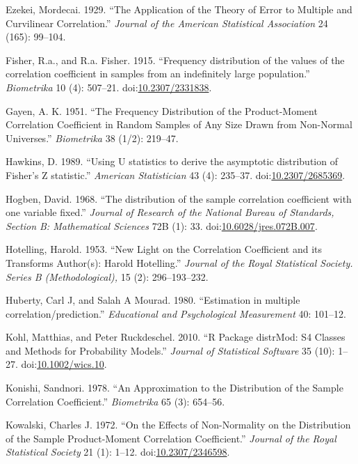 \documentclass[]{article}
\begin{document}
\hypertarget{ref-Ezekei1929}{}
Ezekei, Mordecai. 1929. ``The Application of the Theory of Error to
Multiple and Curvilinear Correlation.'' \emph{Journal of the American
Statistical Association} 24 (165): 99--104.

\hypertarget{ref-Fisher1915}{}
Fisher, R.a., and R.a. Fisher. 1915. ``Frequency distribution of the
values of the correlation coefficient in samples from an indefinitely
large population.'' \emph{Biometrika} 10 (4): 507--21.
doi:\href{https://doi.org/10.2307/2331838}{10.2307/2331838}.

\hypertarget{ref-Gayen1951}{}
Gayen, A. K. 1951. ``The Frequency Distribution of the Product-Moment
Correlation Coefficient in Random Samples of Any Size Drawn from
Non-Normal Universes.'' \emph{Biometrika} 38 (1/2): 219--47.

\hypertarget{ref-Hawkins1989}{}
Hawkins, D. 1989. ``Using U statistics to derive the asymptotic
distribution of Fisher's Z statistic.'' \emph{American Statistician} 43
(4): 235--37.
doi:\href{https://doi.org/10.2307/2685369}{10.2307/2685369}.

\hypertarget{ref-Hogben1968}{}
Hogben, David. 1968. ``The distribution of the sample correlation
coefficient with one variable fixed.'' \emph{Journal of Research of the
National Bureau of Standards, Section B: Mathematical Sciences} 72B (1):
33.
doi:\href{https://doi.org/10.6028/jres.072B.007}{10.6028/jres.072B.007}.

\hypertarget{ref-Hotelling1953}{}
Hotelling, Harold. 1953. ``New Light on the Correlation Coefficient and
its Transforms Author(s): Harold Hotelling.'' \emph{Journal of the Royal
Statistical Society. Series B (Methodological),} 15 (2): 296--193--232.

\hypertarget{ref-Huberty1980}{}
Huberty, Carl J, and Salah A Mourad. 1980. ``Estimation in multiple
correlation/prediction.'' \emph{Educational and Psychological
Measurement} 40: 101--12.

\hypertarget{ref-distrMod}{}
Kohl, Matthias, and Peter Ruckdeschel. 2010. ``R Package distrMod: S4
Classes and Methods for Probability Models.'' \emph{Journal of
Statistical Software} 35 (10): 1--27.
doi:\href{https://doi.org/10.1002/wics.10}{10.1002/wics.10}.

\hypertarget{ref-Konishi1978}{}
Konishi, Sandnori. 1978. ``An Approximation to the Distribution of the
Sample Correlation Coefficient.'' \emph{Biometrika} 65 (3): 654--56.

\hypertarget{ref-Kowalski1972}{}
Kowalski, Charles J. 1972. ``On the Effects of Non-Normality on the
Distribution of the Sample Product-Moment Correlation Coefficient.''
\emph{Journal of the Royal Statistical Society} 21 (1): 1--12.
doi:\href{https://doi.org/10.2307/2346598}{10.2307/2346598}.
\end{document}
